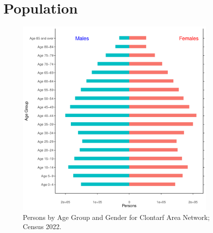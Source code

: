 \documentclass{article}
\begin{document}
\pagebreak

\section{Population} 
\label{sect:Pop}

\begin{figure}[h]
	\centering
	\includegraphics[width = 100mm]{../figures/PyramidPlot.pdf}
	\caption{Persons by Age Group and Gender for Clontarf Area Network; Census 2022.}
	\label{fig:2ae19629-1a6a-13a3-e055-000000000001}
	\end{figure}
\end{document}
